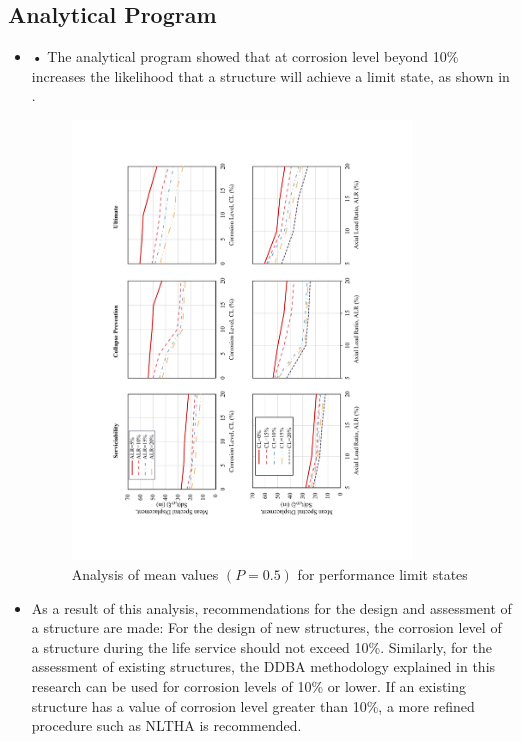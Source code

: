 \subsection{Analytical Program}
\begin{itemize}
    \item •	The analytical program showed that at corrosion level beyond 10\% increases the likelihood that a structure will achieve a limit state, as shown in  .
    
    \begin{figure}[htbp]
	\centering
	\includegraphics[width=0.85\textwidth]{VAC Thesis 2.0/Chapter-5/figs/Analysis_of_Mean_SDs.pdf}
	\caption{Analysis of mean values $(P=0.5)$ for performance limit states}
	\label{fig:mean_prob_vs_CL_ch7}
    \end{figure}
    
    \item As a result of this analysis, recommendations for the design and assessment of a structure are made: For the design of new structures, the corrosion level of a structure during the life service should not exceed 10\%. Similarly, for the assessment of existing structures, the DDBA methodology explained in this research can be used for corrosion levels of 10\% or lower. If an existing structure has a value of corrosion level greater than 10\%, a more refined procedure such as NLTHA is recommended.
\end{itemize}

